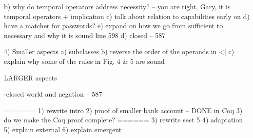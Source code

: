 b) why do temporal operators address necessity? -- you are right, Gary, it is temporal operators + implication
c) talk about relation to capabilities early on
d) have a matcher for passwords? 
e) expand on how we go from sufficient to necessary and why it is sound line 598
d) closed -- 587


4) Smaller aspects
a) subclasses
b) reverse the order of the operands in <| 
c) explain why some of the rules in Fig. 4 & 5 are sound


LARGER aspects

-closed world and negation -- 587

======
1) rewrite intro
2) proof of smaller bank account -- DONE in Coq
3) do we make the Coq proof complete?  ======
3) rewrite sect 5
4) adaptation 
5) explain external 
6) explain emergent

